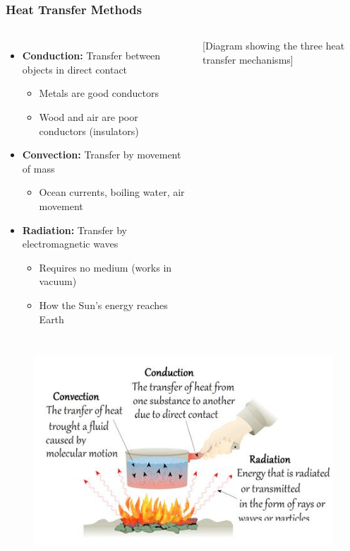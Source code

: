 \documentclass{beamer}
\begin{document}
\begin{frame}
    \frametitle{Heat Transfer Methods}
    \begin{columns}
        \begin{itemize}
            \item \textbf{Conduction:} Transfer between objects in direct contact
            \begin{itemize}
                \item Metals are good conductors
                \item Wood and air are poor conductors (insulators)
            \end{itemize}
            \item \textbf{Convection:} Transfer by movement of mass
            \begin{itemize}
                \item Ocean currents, boiling water, air movement
            \end{itemize}
            \item \textbf{Radiation:} Transfer by electromagnetic waves
            \begin{itemize}
                \item Requires no medium (works in vacuum)
                \item How the Sun's energy reaches Earth
            \end{itemize}
        \end{itemize}
        
        \begin{center}
            \alert{[Diagram showing the three heat transfer mechanisms]}
        \end{center}
    \end{columns}

    \end{frame}

\begin{frame}
\begin{figure}
    \centering
    \includegraphics[width=0.75\linewidth]{th-2198955217.jpg}
\end{figure}

\end{frame}
\end{document}
